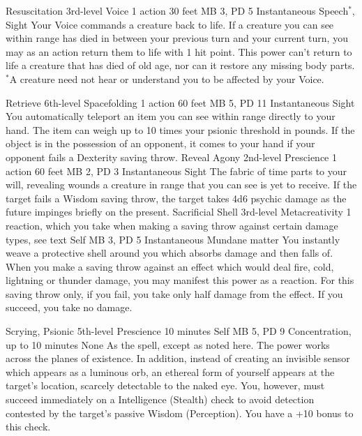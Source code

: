 \DndPowerHeader%
    {Resuscitation\label{pwr:resuscitation}}
    {3rd-level Voice}
    {1 action}
    {30 feet}
    {MB 3, PD 5}
    {Instantaneous}
    {Speech$^*$, Sight}
Your Voice commands a creature back to life.
If a creature you can see within range has died in between
your previous turn and your current turn, you may as an action
return them to life with 1 hit point. This power can't return
to life a creature that has died of old age, nor can it restore
any missing body parts.
$^*$A creature need not hear or understand you to be affected
by your Voice.

\DndPowerHeader%
    {Retrieve\label{pwr:retrieve}}
    {6th-level Spacefolding}
    {1 action}
    {60 feet}
    {MB 5, PD 11}
    {Instantaneous}
    {Sight}
You automatically teleport an item you can
see within range directly to your hand. The item can weigh
up to 10 times your psionic threshold in pounds. If the object
is in the possession of an opponent, it comes to your hand
if your opponent fails a Dexterity saving throw.
\DndPowerHeader%
    {Reveal Agony\label{pwr:reveal_agony}}
    {2nd-level Prescience}
    {1 action}
    {60 feet}
    {MB 2, PD 3}
    {Instantaneous}
    {Sight}
The fabric of time parts to your will, revealing
wounds a creature in range that you can see
is yet to receive. If the target
fails a Wisdom saving throw, the target takes 4d6 psychic
damage as the future impinges briefly on the present.
\DndPowerHeader%
    {Sacrificial Shell\label{pwr:sacrificial_shell}}
    {3rd-level Metacreativity}
    {1 reaction, which you take when making a saving throw against certain damage types, see text}
    {Self}
    {MB 3, PD 5}
    {Instantaneous}
    {Mundane matter}
You instantly weave a protective shell around
you which absorbs damage and then falls of. When you make
a saving throw against an effect which would deal fire, cold,
lightning or thunder damage, you may manifest this power as
a reaction. For this saving throw only, if you fail, you take
only half damage from the effect. If you succeed, you take
no damage.

\DndPowerHeader%
    {Scrying, Psionic\label{pwr:scrying_psionic}}
    {5th-level Prescience}
    {10 minutes}
    {Self}
    {MB 5, PD 9}
    {Concentration, up to 10 minutes}
    {None}
As the  spell, except as noted
here. The power works across the planes of existence. In addition,
instead of creating an invisible sensor which appears as a
luminous orb, an ethereal form of yourself appears at the
target's location, scarcely detectable to the naked eye.
You, however, must succeed immediately on a Intelligence (Stealth)
check to avoid detection contested by the target's passive
Wisdom (Perception). You have a +10 bonus to this check.

